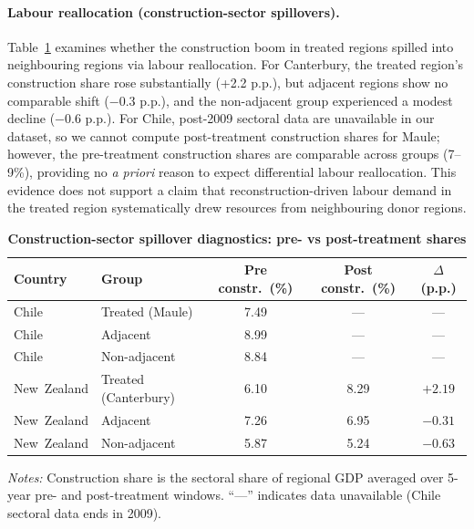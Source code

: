 \documentclass[12pt]{article}
\begin{document}
\paragraph{Labour reallocation (construction-sector spillovers).}
Table~\ref{tab:sector_spillover_diagnostics} examines whether the construction boom in treated regions spilled into neighbouring regions via labour reallocation. For Canterbury, the treated region's construction share rose substantially (+2.2 p.p.), but adjacent regions show no comparable shift ($-0.3$ p.p.), and the non-adjacent group experienced a modest decline ($-0.6$ p.p.). For Chile, post-2009 sectoral data are unavailable in our dataset, so we cannot compute post-treatment construction shares for Maule; however, the pre-treatment construction shares are comparable across groups (7--9\%), providing no \emph{a priori} reason to expect differential labour reallocation. This evidence does not support a claim that reconstruction-driven labour demand in the treated region systematically drew resources from neighbouring donor regions.

\begin{table}[H]
\centering
\caption{\textbf{Construction-sector spillover diagnostics: pre- vs post-treatment shares}}
\label{tab:sector_spillover_diagnostics}
\small
\setlength{\tabcolsep}{5pt}
\begin{tabular}{llccc}
\toprule
\textbf{Country} & \textbf{Group} & \textbf{Pre constr.\ (\%)} & \textbf{Post constr.\ (\%)} & \textbf{$\Delta$ (p.p.)} \\
\midrule
Chile & Treated (Maule)      & 7.49 & --- & --- \\
Chile & Adjacent  & 8.99 & --- & --- \\
Chile & Non-adjacent & 8.84 & --- & --- \\
\midrule
New~Zealand & Treated (Canterbury) & 6.10 & 8.29 & $+2.19$ \\
New~Zealand & Adjacent & 7.26 & 6.95 & $-0.31$ \\
New~Zealand & Non-adjacent & 5.87 & 5.24 & $-0.63$ \\
\bottomrule
\end{tabular}
\begin{minipage}{0.95\textwidth}\footnotesize\vspace{1ex}
\textit{Notes:} Construction share is the sectoral share of regional GDP averaged over 5-year pre- and post-treatment windows. ``---'' indicates data unavailable (Chile sectoral data ends in 2009).
\end{minipage}
\end{table}
\end{document}
